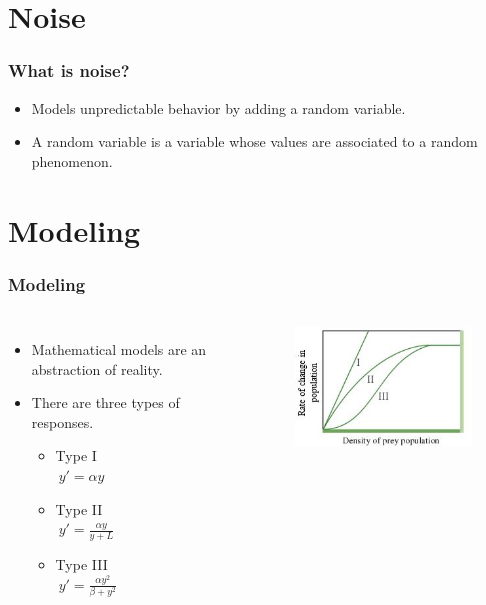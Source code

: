 \section{Noise}

\begin{frame}
  \frametitle{What is noise?}
  \begin{itemize}
  \item Models unpredictable behavior by adding a random variable.
  \item A random variable is a variable whose values are associated to a random phenomenon.
  \end{itemize}
\end{frame}

\section{Modeling}

\begin{frame}
  \frametitle{Modeling}
  \begin{columns}
      \begin{itemize}
	\item Mathematical models are an abstraction of reality.
	\item There are three types of responses. 
	\begin{itemize}
		\item Type I\\
		$\ y'=\alpha y$
		\item Type II\\
		$\ y' = \frac{\alpha y}{y+ L}$ 
		\item Type III\\
		$\ y'= \frac {\alpha y^2}{\beta + y^2}$
	\end{itemize}
       \end{itemize}
      \begin {figure}
	\includegraphics[scale = 0.7, right]{Responses}
       \end{figure}
  \end{columns}
\end{frame}

